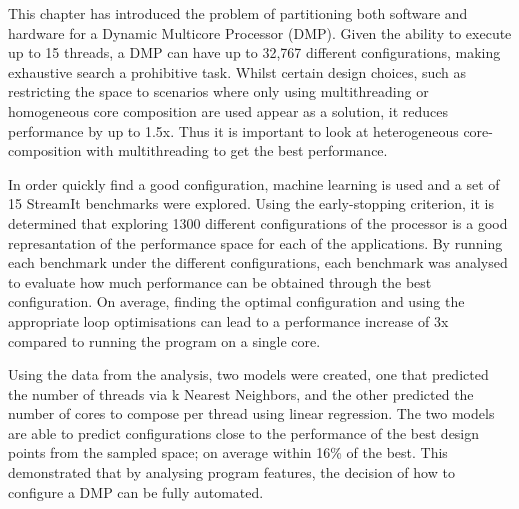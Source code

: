 This chapter has introduced the problem of partitioning both software and hardware for a Dynamic Multicore Processor (DMP).
Given the ability to execute up to 15 threads, a DMP can have up to 32,767 different configurations, making exhaustive search a prohibitive task.
Whilst certain design choices, such as restricting the space to scenarios where only using multithreading or homogeneous core composition are used appear as a solution, it reduces performance by up to 1.5x.
Thus it is important to look at heterogeneous core-composition with multithreading to get the best performance.

In order quickly find a good configuration, machine learning is used and a set of 15 StreamIt benchmarks were explored.
Using the early-stopping criterion, it is determined that exploring 1300 different configurations of the processor is a good represantation of the performance space for each of the applications.
By running each benchmark under the different configurations, each benchmark was analysed to evaluate how much performance can be obtained through the best configuration.
On average, finding the optimal configuration and using the appropriate loop optimisations can lead to a performance increase of 3x compared to running the program on a single core.

Using the data from the analysis, two models were created, one that predicted the number of threads via k Nearest Neighbors, and the other predicted the number of cores to compose per thread using linear regression.
The two models are able to predict configurations close to the performance of the best design points from the sampled space; on average within 16\% of the best.
This demonstrated that by analysing program features, the decision of how to configure a DMP can be fully automated.

